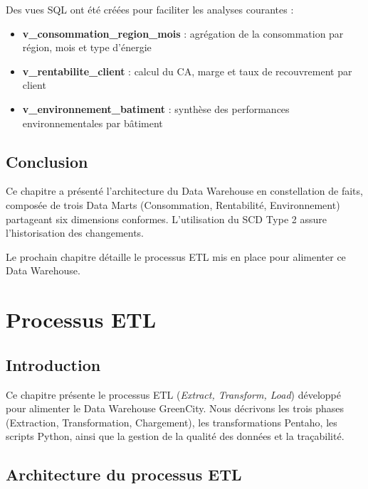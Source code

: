 \documentclass[12pt,a4paper]{report}
\begin{document}
Des vues SQL ont été créées pour faciliter les analyses courantes :

\begin{itemize}
    \item \textbf{v\_consommation\_region\_mois} : agrégation de la consommation par région, mois et type d'énergie
    \item \textbf{v\_rentabilite\_client} : calcul du CA, marge et taux de recouvrement par client
    \item \textbf{v\_environnement\_batiment} : synthèse des performances environnementales par bâtiment
\end{itemize}

\section{Conclusion}

Ce chapitre a présenté l'architecture du Data Warehouse en constellation de faits, composée de trois Data Marts (Consommation, Rentabilité, Environnement) partageant six dimensions conformes. L'utilisation du SCD Type 2 assure l'historisation des changements.

Le prochain chapitre détaille le processus ETL mis en place pour alimenter ce Data Warehouse.

\cleardoublepage



\chapter{Processus ETL}

\section{Introduction}

Ce chapitre présente le processus ETL (\textit{Extract, Transform, Load}) développé pour alimenter le Data Warehouse GreenCity. Nous décrivons les trois phases (Extraction, Transformation, Chargement), les transformations Pentaho, les scripts Python, ainsi que la gestion de la qualité des données et la traçabilité.

\section{Architecture du processus ETL}
\end{document}

